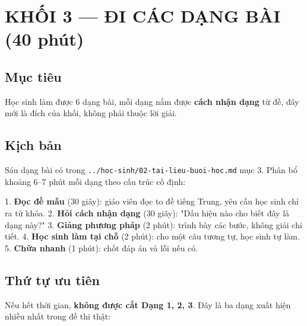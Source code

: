 \documentclass[11pt, a4paper]{article}
\begin{document}
\section{KHỐI 3 — ĐI CÁC DẠNG BÀI (40 phút)}

\subsection{Mục tiêu}

Học sinh làm được 6 dạng bài, mỗi dạng nắm được \textbf{cách nhận dạng} từ đề, đây mới là đích của khối, không phải thuộc lời giải.

\subsection{Kịch bản}

Sáu dạng bài có trong \texttt{../hoc-sinh/02-tai-lieu-buoi-hoc.md} mục 3. Phân bổ khoảng 6–7 phút mỗi dạng theo cấu trúc cố định:

1. \textbf{Đọc đề mẫu} (30 giây): giáo viên đọc to đề tiếng Trung, yêu cầu học sinh chỉ ra từ khóa.
2. \textbf{Hỏi cách nhận dạng} (30 giây): "Dấu hiệu nào cho biết đây là dạng này?"
3. \textbf{Giảng phương pháp} (2 phút): trình bày các bước, không giải chi tiết.
4. \textbf{Học sinh làm tại chỗ} (2 phút): cho một câu tương tự, học sinh tự làm.
5. \textbf{Chữa nhanh} (1 phút): chốt đáp án và lỗi nếu có.

\subsection{Thứ tự ưu tiên}

Nếu hết thời gian, \textbf{không được cắt Dạng 1, 2, 3}. Đây là ba dạng xuất hiện nhiều nhất trong đề thi thật:

\end{document}
